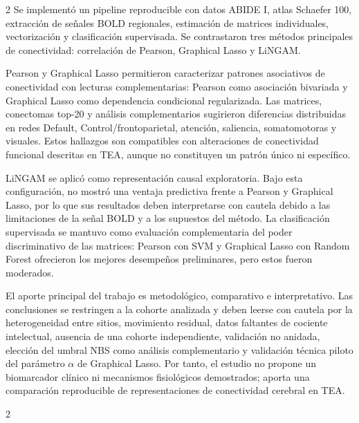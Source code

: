 \documentclass[12pt,letterpaper]{article}
\begin{document}
\begin{multicols}{2}
Se implementó un pipeline reproducible con datos ABIDE I, atlas Schaefer 100,
extracción de señales BOLD regionales, estimación de matrices individuales,
vectorización y clasificación supervisada. Se contrastaron tres métodos
principales de conectividad:
correlación de Pearson, Graphical Lasso y LiNGAM.

Pearson y Graphical Lasso permitieron caracterizar patrones asociativos de
conectividad con lecturas complementarias: Pearson como asociación bivariada y
Graphical Lasso como dependencia condicional regularizada. Las matrices,
conectomas top-20 y análisis complementarios sugirieron diferencias
distribuidas en redes Default, Control/frontoparietal, atención, saliencia,
somatomotoras y visuales. Estos hallazgos son compatibles con alteraciones de
conectividad funcional descritas en TEA, aunque no constituyen un patrón único
ni específico.

LiNGAM se aplicó como representación causal exploratoria. Bajo esta configuración, no
mostró una ventaja predictiva frente a Pearson y Graphical Lasso, por lo que
sus resultados deben interpretarse con cautela debido a las limitaciones de la
señal BOLD y a los supuestos del método. La clasificación supervisada se
mantuvo como evaluación complementaria del poder discriminativo de las matrices:
Pearson con SVM y Graphical Lasso con Random Forest ofrecieron los mejores
desempeños preliminares, pero estos fueron moderados.

El aporte principal del trabajo es metodológico, comparativo e interpretativo.
Las conclusiones se restringen a la cohorte analizada y deben leerse con
cautela por la heterogeneidad entre sitios, movimiento residual, datos faltantes
de cociente intelectual, ausencia de una cohorte independiente, validación no
anidada, elección del umbral NBS como análisis complementario y validación
técnica piloto del parámetro $\alpha$ de Graphical Lasso.
Por tanto, el estudio no propone un biomarcador clínico ni mecanismos
fisiológicos demostrados; aporta una comparación reproducible de representaciones de
conectividad cerebral en TEA.


\end{multicols}


\begin{multicols}{2}

\end{multicols}
\end{document}
